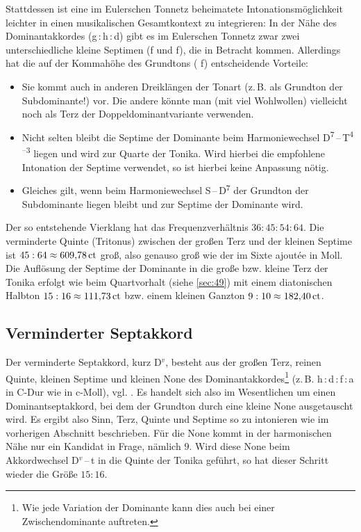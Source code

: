 Stattdessen ist eine im Eulerschen Tonnetz beheimatete Intonationsmöglichkeit
leichter in einen musikalischen Gesamtkontext zu integrieren: In der Nähe des
Dominantakkordes (g\,:\,\naturalm h\,:\,d) gibt es im Eulerschen Tonnetz zwar
zwei unterschiedliche kleine Septimen (\natural f und \naturalp f), die in
Betracht kommen.  Allerdings hat die auf der Kommahöhe des Grundtons (\natural
f) entscheidende Vorteile:
\begin{itemize}
\item Sie kommt auch in anderen Dreiklängen der Tonart (z.\,B. als Grundton der
  Subdominante!) vor.  Die andere könnte man (mit viel Wohlwollen) vielleicht
  noch als Terz der Doppeldominantvariante verwenden.
\item Nicht selten bleibt die Septime der Dominante beim Harmoniewechsel
  D\textsuperscript{$7$}\,–\,T\textsuperscript{$4$–$3$} liegen und wird zur
  Quarte der Tonika.  Wird hierbei die empfohlene Intonation der Septime
  verwendet, so ist hierbei keine Anpassung nötig.
\item Gleiches gilt, wenn beim Harmoniewechsel S\,–\,D\textsuperscript{$7$} der
  Grundton der Subdominante liegen bleibt und zur Septime der Dominante wird.
\end{itemize}
Der so entstehende Vierklang hat das Frequenzverhältnis $36:45:54:64$. Die
verminderte Quinte (Tritonus) zwischen der großen Terz und der kleinen Septime
ist $45:64\approx 609{,}78\,\mathrm{ct}$ groß, also genauso groß wie der im Sixte
ajoutée in Moll. Die Auflösung der Septime der Dominante in die große bzw.
kleine Terz der Tonika erfolgt wie beim Quartvorhalt (siehe \cref{sec:49}) mit
einem diatonischen Halbton $15:16\approx 111{,}73\,\mathrm{ct}$ bzw. einem kleinen
Ganzton $9:10\approx 182{,}40\,\mathrm{ct}$.

\subsection{Verminderter Septakkord}
\label{sec:dim7syn}


Der verminderte Septakkord, kurz D$^v$, besteht aus der großen Terz, reinen
Quinte, kleinen Septime und kleinen None des Dominantakkordes\footnote{Wie jede
  Variation der Dominante kann dies auch bei einer Zwischendominante auftreten.}
(z.\,B. h\,:\,d\,:\,f\,:\,\flat a in C-Dur wie in c-Moll),
vgl. \cite[{}11.1]{Skript}. Es handelt sich also im Wesentlichen um einen
Dominantseptakkord, bei dem der Grundton durch eine kleine None ausgetauscht
wird. Es ergibt also Sinn, Terz, Quinte und Septime so zu intonieren wie im
vorherigen Abschnitt beschrieben. Für die None kommt in der harmonischen Nähe
nur ein Kandidat in Frage, nämlich \flatp $9$.  Wird diese None beim
Akkordwechsel D$^v$\,–\,t in die Quinte der Tonika geführt, so hat dieser
Schritt wieder die Größe $15:16$.

